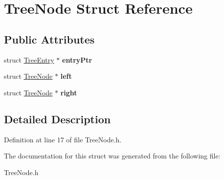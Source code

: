 \hypertarget{structTreeNode}{
\section{TreeNode Struct Reference}
\label{structTreeNode}
}
\subsection*{Public Attributes}
\begin{DoxyCompactItemize}
\item 
\hypertarget{structTreeNode_a0a60da82baa55d209ff4158538b0e09a}{
struct \hyperlink{structTreeEntry}{TreeEntry} $\ast$ {\bfseries entryPtr}}
\label{structTreeNode_a0a60da82baa55d209ff4158538b0e09a}

\item 
\hypertarget{structTreeNode_af4ab5453a9305f5620c0eb9ac360fb90}{
struct \hyperlink{structTreeNode}{TreeNode} $\ast$ {\bfseries left}}
\label{structTreeNode_af4ab5453a9305f5620c0eb9ac360fb90}

\item 
\hypertarget{structTreeNode_a66ef3b5201772f36789f8da6fe46eda6}{
struct \hyperlink{structTreeNode}{TreeNode} $\ast$ {\bfseries right}}
\label{structTreeNode_a66ef3b5201772f36789f8da6fe46eda6}

\end{DoxyCompactItemize}


\subsection{Detailed Description}


Definition at line 17 of file TreeNode.h.



The documentation for this struct was generated from the following file:\begin{DoxyCompactItemize}
\item 
TreeNode.h\end{DoxyCompactItemize}
